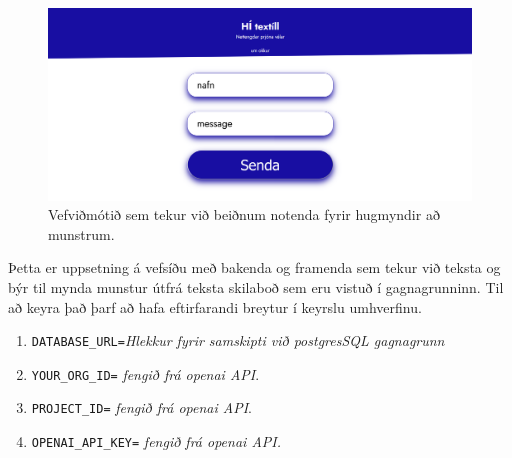 \begin{enumerate}
\begin{figure}[t]
    \centering
    \includegraphics[width=0.8\linewidth]{myndir/passapnextscreen.png}
    \caption{Vefviðmótið sem tekur við beiðnum notenda fyrir hugmyndir að munstrum.}
\end{figure}
    Þetta er uppsetning á vefsíðu með bakenda og framenda sem tekur við teksta og býr til mynda munstur útfrá teksta skilaboð sem eru vistuð í gagnagrunninn. Til að keyra það þarf að hafa eftirfarandi breytur í keyrslu umhverfinu.
    \begin{enumerate}
        \item \texttt{DATABASE\_URL=}\textit{Hlekkur fyrir samskipti við postgresSQL gagnagrunn}
        \item \texttt{YOUR\_ORG\_ID=} \textit{fengið frá openai API}.
        \item \texttt{PROJECT\_ID=} \textit{fengið frá openai API}.
        \item \texttt{OPENAI\_API\_KEY=} \textit{fengið frá openai API.}
    \end{enumerate}
\end{enumerate}

